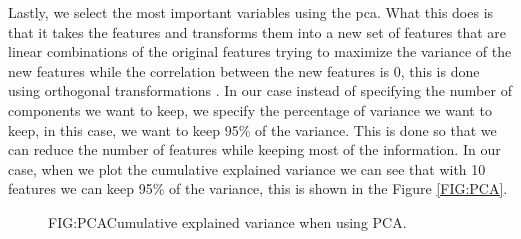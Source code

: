 Lastly, we select the most important variables using the \ac{pca}. What this does is that it takes the features and transforms them into a new set of features that are linear combinations of the original features trying to maximize the variance of the new features while the correlation between the new features is 0, this is done using orthogonal transformations \cite{daffertshofer_pca_2004}. In our case instead of specifying the number of components we want to keep, we specify the percentage of variance we want to keep, in this case, we want to keep 95\% of the variance. This is done so that we can reduce the number of features while keeping most of the information. In our case, when we plot the cumulative explained variance we can see that with 10 features we can keep 95\% of the variance, this is shown in the Figure \ref{FIG:PCA}.

\begin{figure}[PCA]{FIG:PCA}{Cumulative explained variance when using PCA.}
\end{figure}

